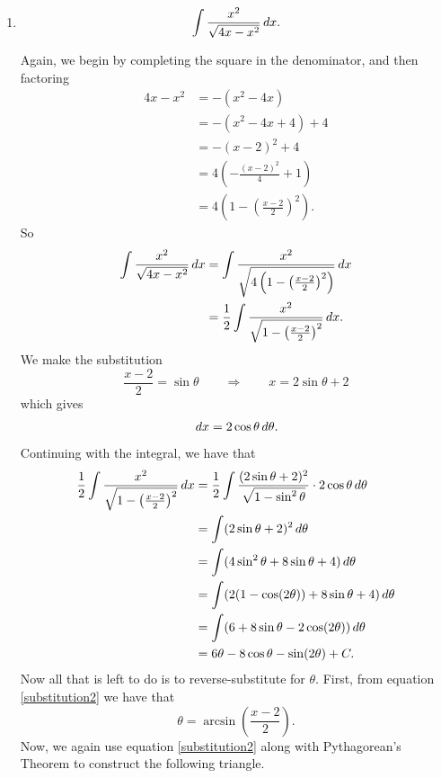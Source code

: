 \documentclass[handout,instructornotes]{ximera}
\begin{document}
\begin{problem}
\begin{enumerate}
	\item 
	\[
	\int \frac{x^2}{\sqrt{4x-x^2}} \,d x.
	\]
	\begin{freeResponse}
	Again, we begin by completing the square in the denominator, and then factoring
		\begin{align*}
		4x-x^2 &= -(x^2-4x)  \\
		&= -(x^2-4x+4) + 4  \\
		&= -(x-2)^2 + 4  \\
		&= 4 \left( - \frac{(x-2)^2}{4} + 1 \right)  \\
		&= 4 \left( 1 - \left( \frac{x-2}{2} \right)^2 \right).
		\end{align*}
	So
		\begin{align*}
		\int \frac{x^2}{\sqrt{4x-x^2}} \,d x &= \int \frac{x^2}{\sqrt{4 \left( 1 - \left( \frac{x-2}{2} \right)^2 \right)}} \,d x  \\
		&= \frac{1}{2} \int \frac{x^2}{\sqrt{1 - \left( \frac{x-2}{2} \right)^2}} \,d x.
		\end{align*}
	We make the substitution
		\begin{equation}\label{substitution2}
		\frac{x-2}{2} = \sin \theta	\qquad	\Longrightarrow	\qquad	x = 2\sin \theta + 2
		\end{equation}
	which gives
		\[
		\,d x = 2 \cos \theta \,d \theta.
		\]
	Continuing with the integral, we have that
		\begin{align*}
		\frac{1}{2} \int \frac{x^2}{\sqrt{1 - \left( \frac{x-2}{2} \right)^2}} \,d x
		&= \frac{1}{2} \int \frac{(2 \sin \theta + 2)^2}{\sqrt{1 - \sin^2 \theta}} \cdot 2 \cos \theta \,d \theta  \\
		&= \int (2\sin \theta + 2)^2 \,d \theta  \\
		&= \int ( 4 \sin^2 \theta + 8 \sin \theta + 4) \,d \theta  \\
		&= \int (2(1-\cos(2\theta)) + 8\sin \theta + 4) \,d \theta  \\
		&= \int (6 + 8\sin \theta - 2\cos(2\theta)) \,d \theta  \\
		&= 6 \theta - 8 \cos \theta - \sin(2\theta) + C.
		\end{align*}
	Now all that is left to do is to reverse-substitute for $\theta$.  
	First, from equation \eqref{substitution2} we have that
		\[
		\theta = \arcsin \left( \frac{x-2}{2} \right).
		\]
	Now, we again use equation \eqref{substitution2} along with Pythagorean's Theorem to construct the following triangle.
	

\end{freeResponse}
\end{enumerate}
\end{problem}
\end{document}
